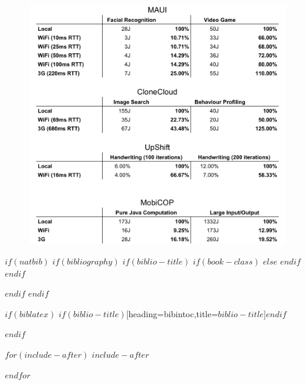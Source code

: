 % 
\begin{figure}[h]
  \centering
  \includegraphics[page=1,width=1\textwidth]{Appendix/Comparison of Results.png}
\end{figure}

\backmatter
$if(natbib)$
  $if(bibliography)$
  $if(biblio-title)$
  $if(book-class)$
  \renewcommand\bibname{$biblio-title$}
  $else$
  \renewcommand\refname{$biblio-title$}
  $endif$
  $endif$
  

  $endif$
$endif$

$if(biblatex)$
\printbibliography$if(biblio-title)$[heading=bibintoc,title={$biblio-title$}]$endif$

$endif$

$for(include-after)$
$include-after$

$endfor$


